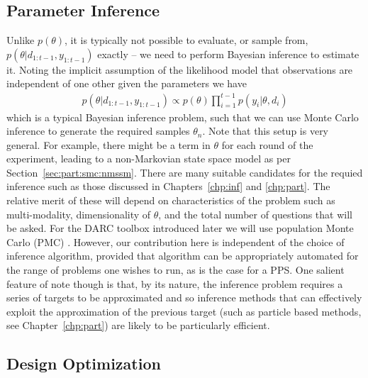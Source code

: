 \subsection{Parameter Inference}
\label{sec:design:auto:inf}

Unlike $p\left(\theta\right)$, it is typically not possible to evaluate, or sample from, $p\left(\theta | d_{1:t-1}, y_{1:t-1}\right)$ exactly -- we need to perform Bayesian inference to estimate it.  Noting
the implicit assumption of the likelihood model that observations are independent of one other given the
parameters we have
\begin{align}
p\left(\theta | d_{1:t-1}, y_{1:t-1}\right) \propto p(\theta) \prod_{i=1}^{t-1} p(y_i | \theta, d_i)
\end{align}
which is a typical Bayesian inference problem, such that we can use Monte Carlo inference
to generate the required samples $\theta_n$.  Note that this setup is very general.   For example, there might
be a term in $\theta$ for each round of the experiment, leading to a non-Markovian state space model as
per Section~\ref{sec:part:smc:nmssm}.
There are many suitable candidates for the requied inference such as those discussed in Chapters~\ref{chp:inf} and
\ref{chp:part}.
The relative merit of these will depend on
characteristics of the problem such as multi-modality, dimensionality of $\theta$, and the total
number of questions that will be asked.  For the DARC toolbox introduced later we will use 
population Monte Carlo (PMC) \citep{cappe2004population}.  However, our contribution here is independent of
the choice of inference algorithm, provided that algorithm can be appropriately automated for the range
of problems one wishes to run, as is the case for a PPS.  One salient feature of note though is
that, by its nature, the inference problem requires a series of targets to be approximated and so
inference methods that can effectively exploit the approximation of the previous target (such as particle
based methods, see Chapter~\ref{chp:part}) are likely to be particularly efficient.

\subsection{Design Optimization}
\label{sec:design:auto:optimization}


